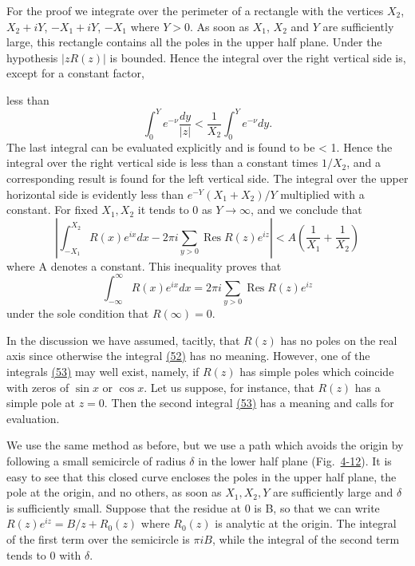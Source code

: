 For the proof we integrate over the perimeter of a rectangle with the vertices $X_{2}$, $X_{2} + iY$, $-X_{1} + iY$, $-X_{1}$ where $Y > 0$. As soon as $X_{1}$, $X_{2}$ and $Y$ are sufficiently large, this rectangle contains all the poles in the upper half plane. Under the hypothesis $|zR(z)|$ is bounded. Hence the integral over the right vertical side is, except for a constant factor,

less than
\begin{equation*}
\int_ {0} ^ {Y} e ^ {- \nu} \frac {d y}{| z |} <   \frac {1}{X _ {2}} \int_ {0} ^ {Y} e ^ {- \nu} d y.
\end{equation*}
The last integral can be evaluated explicitly and is found to be < 1. Hence the integral over the right vertical side is less than a constant times $1/X_{2}$, and a corresponding result is found for the left vertical side. The integral over the upper horizontal side is evidently less than $e^{-Y}(X_{1} + X_{2})/Y$ multiplied with a constant. For fixed $X_{1}, X_{2}$ it tends to 0 as $Y \to \infty$, and we conclude that
\begin{equation*}
\left| \int_ {- X _ {1}} ^ {X _ {2}} R (x) e ^ {i x} d x - 2 \pi i \sum_ {y > 0} \operatorname{Res} R (z) e ^ {i z} \right| <   A \left(\frac {1}{X _ {1}} + \frac {1}{X _ {2}}\right)
\end{equation*}
where A denotes a constant. This inequality proves that
\begin{equation*}
\int_ {- \infty} ^ {\infty} R (x) e ^ {i x} d x = 2 \pi i \sum_ {y > 0} \operatorname{Res} R (z) e ^ {i z}
\end{equation*}
under the sole condition that $R(\infty) = 0$.

In the discussion we have assumed, tacitly, that $R(z)$ has no poles on the real axis since otherwise the integral \hyperref[eq:4.52]{(52)} has no meaning. However, one of the integrals \hyperref[eq:4.53]{(53)} may well exist, namely, if $R(z)$ has simple poles which coincide with zeros of $\sin x$ or $\cos x$. Let us suppose, for instance, that $R(z)$ has a simple pole at $z = 0$. Then the second integral \hyperref[eq:4.53]{(53)} has a meaning and calls for evaluation.

We use the same method as before, but we use a path which avoids the origin by following a small semicircle of radius $\delta$ in the lower half plane (Fig.~\hyperref[fig:4-12]{4-12}). It is easy to see that this closed curve encloses the poles in the upper half plane, the pole at the origin, and no others, as soon as $X_{1}, X_{2}, Y$ are sufficiently large and $\delta$ is sufficiently small. Suppose that the residue at 0 is B, so that we can write $R(z)e^{iz} = B/z + R_{0}(z)$ where $R_{0}(z)$ is analytic at the origin. The integral of the first term over the semicircle is $\pi i B$, while the integral of the second term tends to 0 with $\delta$.


